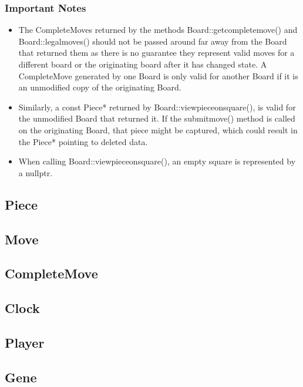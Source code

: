 \documentclass[letterpaper]{article}
\newcommand{\code}[1]{#1}
\renewcommand\_{\textunderscore\allowbreak}
\begin{document}
\subsubsection{Important Notes}
\begin{itemize}
\item The \code{Complete\_Move}s returned by the methods \code{Board::get\_complete\_move()} and \code{Board::legal\_moves()} should not be passed around far away from the Board that returned them as there is no guarantee they represent valid moves for a different board or the originating board after it has changed state. A \code{Complete\_Move} generated by one \code{Board} is only valid for another \code{Board} if it is an unmodified copy of the originating \code{Board}.

\item Similarly, a \code{const Piece*} returned by \code{Board::view\_piece\_on\_square()}, is valid for the unmodified Board that returned it. If the \code{submit\_move()} method is called on the originating Board, that piece might be captured, which could result in the \code{Piece*} pointing to deleted data.

\item When calling \code{Board::view\_piece\_on\_square()}, an empty square is represented by a \code{nullptr}.
\end{itemize}

\subsection{Piece}

\subsection{Move}

\subsection{Complete\_Move}

\subsection{Clock}

\subsection{Player}

\subsection{Gene}
\end{document}
